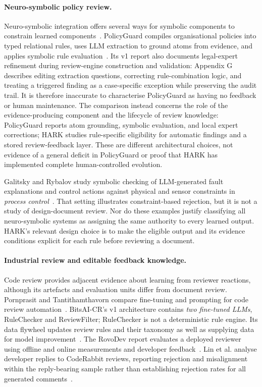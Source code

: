 \documentclass[computers,article,submit,moreauthors]{Definitions/mdpi}
\begin{document}
\paragraph{Neuro-symbolic policy review.}
Neuro-symbolic integration offers several ways for symbolic components to constrain learned components~\cite{garcez2023}. PolicyGuard compiles organisational policies into typed relational rules, uses LLM extraction to ground atoms from evidence, and applies symbolic rule evaluation~\cite{malik2026}. Its v1 report also documents legal-expert refinement during review-engine construction and validation: Appendix G describes editing extraction questions, correcting rule-combination logic, and treating a triggered finding as a case-specific exception while preserving the audit trail. It is therefore inaccurate to characterise PolicyGuard as having no feedback or human maintenance. The comparison instead concerns the role of the evidence-producing component and the lifecycle of review knowledge: PolicyGuard reports atom grounding, symbolic evaluation, and local expert corrections; HARK studies rule-specific eligibility for automatic findings and a stored review-feedback layer. These are different architectural choices, not evidence of a general deficit in PolicyGuard or proof that HARK has implemented complete human-controlled evolution.

Galitsky and Rybalov study symbolic checking of LLM-generated fault explanations and control actions against physical and sensor constraints in \emph{process control}~\cite{neuro2026}. That setting illustrates constraint-based rejection, but it is not a study of design-document review. Nor do these examples justify classifying all neuro-symbolic systems as assigning the same authority to every learned output. HARK's relevant design choice is to make the eligible output and its evidence conditions explicit for each rule before reviewing a document.

\paragraph{Industrial review and editable feedback knowledge.}
Code review provides adjacent evidence about learning from reviewer reactions, although its artefacts and evaluation units differ from document review. Pornprasit and Tantithamthavorn compare fine-tuning and prompting for code review automation~\cite{pornprasit2024}. BitsAI-CR's v1 architecture contains \emph{two fine-tuned LLMs}, RuleChecker and ReviewFilter; RuleChecker is not a deterministic rule engine. Its data flywheel updates review rules and their taxonomy as well as supplying data for model improvement~\cite{sun2025}. The RovoDev report evaluates a deployed reviewer using offline and online measurements and developer feedback~\cite{rovo2026}. Lin et al. analyse developer replies to CodeRabbit reviews, reporting rejection and misalignment within the reply-bearing sample rather than establishing rejection rates for all generated comments~\cite{lin2026}.
\end{document}
